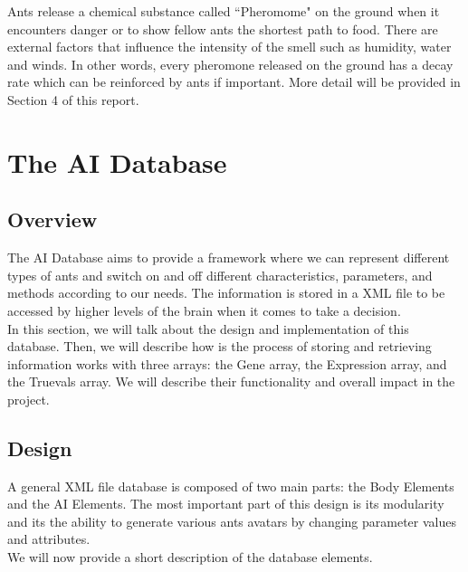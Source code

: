 \documentclass[titlepage, 12pt]{article}
\begin{document}
Ants release a chemical substance called ``Pheromome" on the ground when it encounters danger or to show fellow ants the shortest path to food.  There are external factors that influence the intensity of the smell such as humidity, water and winds. In other words, every pheromone released on the ground has a decay rate which can be reinforced by ants if important. More detail will be provided in Section 4 of this report. 

\section{The AI Database}

\subsection{Overview}
The AI Database aims to provide a framework where we can represent different types of ants and switch on and off different characteristics, parameters, and methods according to our needs. The information is stored in a XML file to be accessed by higher levels of the brain when it comes to take a decision. \\

In this section, we will talk about the design and implementation of this database. Then, we will describe how is the process of storing and retrieving information works with three arrays: the Gene array, the Expression array, and the Truevals array. We will describe their functionality and overall impact in the project. \\

\subsection{Design}

A general XML file database is composed of two main parts: the Body Elements and the AI Elements. The most important part of this design is its modularity and its the ability to generate various ants avatars by changing parameter values and attributes. \\

We will now provide a short description of the database elements.  
\end{document}
